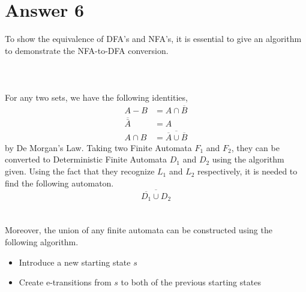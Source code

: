 \documentclass[12pt]{article}
\begin{document}
\section*{Answer 6}
To show the equivalence of DFA's and NFA's, it is essential to give an algorithm to demonstrate the NFA-to-DFA conversion.\\~\\
\\~\\
For any two sets, we have the following identities,
\begin{align*}
    A-B &= A \cap \overline{B}\\
    \overline{\bar A} &= A\\
    A\cap B &= \overline{\overline{A}\cup\overline{B}}
\end{align*}
by De Morgan's Law. Taking two Finite Automata $F_1$ and $F_2$, they can be converted to Deterministic Finite Automata $D_1$ and $D_2$ using the algorithm given. Using the fact that they recognize $L_1$ and $L_2$ respectively, it is needed to find the following automaton. 
\[
\overline{\overline{D_1}\cup D_2}
\]
\\~\\
Moreover, the union of any finite automata can be constructed using the following algorithm.
\begin{itemize}
    \item Introduce a new starting state $s$
    \item Create e-transitions from $s$ to both of the previous starting states
\end{itemize}
\end{document}
